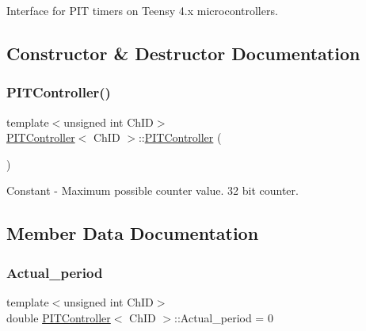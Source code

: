 Interface for P\+IT timers on Teensy 4.\+x microcontrollers. 

\subsection{Constructor \& Destructor Documentation}
\mbox{\label{classPITController_ad9ef4f151495076fad7b0c556e48b117}} 
\subsubsection{\texorpdfstring{P\+I\+T\+Controller()}{PITController()}}
{\footnotesize\ttfamily template$<$unsigned int Ch\+ID$>$ \\
\hyperlink{classPITController}{P\+I\+T\+Controller}$<$ Ch\+ID $>$\+::\hyperlink{classPITController}{P\+I\+T\+Controller} (\begin{DoxyParamCaption}{ }\end{DoxyParamCaption})\hspace{0.3cm}{\ttfamily [inline]}}



Constant -\/ Maximum possible counter value. 32 bit counter. 



\subsection{Member Data Documentation}
\mbox{\label{classPITController_a549601e7c66941d7872a6e7d38ed9563}} 
\subsubsection{\texorpdfstring{Actual\+\_\+period}{Actual\_period}}
{\footnotesize\ttfamily template$<$unsigned int Ch\+ID$>$ \\
double \hyperlink{classPITController}{P\+I\+T\+Controller}$<$ Ch\+ID $>$\+::Actual\+\_\+period = 0}

\mbox{\label{classPITController_ae3d74bb18e5b22769e895f592cb16129}} 
